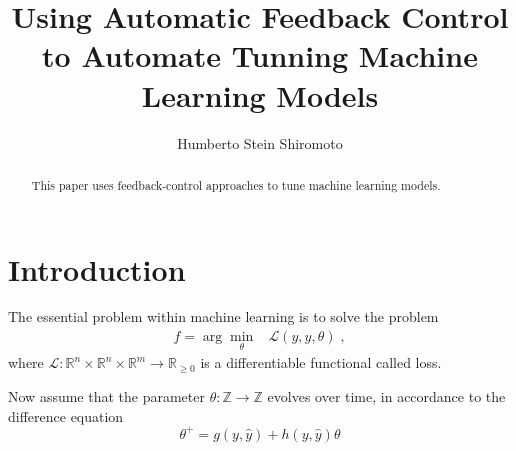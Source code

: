 \documentclass{tufte-handout}
\title{Using Automatic Feedback Control to Automate Tunning Machine Learning Models}
\author[H. Stein Shiromoto]{Humberto Stein Shiromoto}
\begin{document}
\maketitle%

\begin{abstract}
\noindent
This paper uses feedback-control approaches to tune machine learning models.
\end{abstract}


\section{Introduction}

The essential problem within machine learning is to solve the problem
\begin{eqnarray}
  f=\arg\min_\theta&\mathcal{L}(y,\hat{y},\theta)\;,
\end{eqnarray}
where $\mathcal{L}:\mathbb{R}^n\times\mathbb{R}^n\times\mathbb{R}^m\to\mathbb{R}_{\geq0}$ is a differentiable functional called loss.

Now assume that the parameter $\theta:\mathbb{Z}\to\mathbb{Z}$ evolves over time, in accordance to the difference equation
\begin{equation}
\theta^+=g(y,\hat{y})+h(y,\hat{y})\theta
\end{equation}
\end{document}
